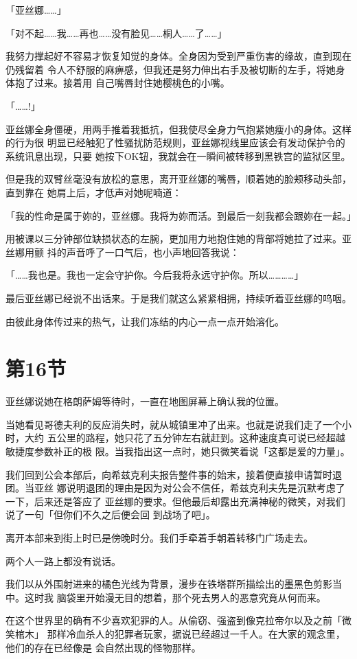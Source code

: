\documentclass[11pt]{book}
\begin{document}
「亚丝娜……」

「对不起……我……再也……没有脸见……桐人……了……」

我努力撑起好不容易才恢复知觉的身体。全身因为受到严重伤害的缘故，直到现在仍残留着
令人不舒服的麻痹感，但我还是努力伸出右手及被切断的左手，将她身体抱了过来。接着用
自己嘴唇封住她樱桃色的小嘴。

「……!」

亚丝娜全身僵硬，用两手推着我抵抗，但我使尽全身力气抱紧她瘦小的身体。这样的行为很
明显已经触犯了性骚扰防范规则，亚丝娜视线里应该会有发动保护令的系统讯息出现，只要
她按下OK钮，我就会在一瞬间被转移到黑铁宫的监狱区里。

但是我的双臂丝毫没有放松的意思，离开亚丝娜的嘴唇，顺着她的脸颊移动头部，直到靠在
她肩上后，才低声对她呢喃道：

「我的性命是属于妳的，亚丝娜。我将为妳而活。到最后一刻我都会跟妳在一起。」

用被课以三分钟部位缺损状态的左腕，更加用力地抱住她的背部将她拉了过来。亚丝娜用颤
抖的声音呼了一口气后，也小声地回答我说：

「……我也是。我也一定会守护你。今后我将永远守护你。所以…………」

最后亚丝娜已经说不出话来。于是我们就这么紧紧相拥，持续听着亚丝娜的呜咽。

由彼此身体传过来的热气，让我们冻结的内心一点一点开始溶化。
\section{第16节}
\label{sec:org935de97}
亚丝娜说她在格朗萨姆等待时，一直在地图屏幕上确认我的位置。

当她看见哥德夫利的反应消失时，就从城镇里冲了出来。也就是说我们走了一个小时，大约
五公里的路程，她只花了五分钟左右就赶到。这种速度真可说已经超越敏捷度参数补正的极
限。当我指出这一点时，她只微笑着说「这都是爱的力量」。

我们回到公会本部后，向希兹克利夫报告整件事的始末，接着便直接申请暂时退团。当亚丝
娜说明退团的理由是因为对公会不信任，希兹克利夫先是沉默考虑了一下，后来还是答应了
亚丝娜的要求。但他最后却露出充满神秘的微笑，对我们说了一句「但你们不久之后便会回
到战场了吧」。

离开本部来到街上时已是傍晚时分。我们手牵着手朝着转移门广场走去。

两个人一路上都没有说话。

我们以从外围射进来的橘色光线为背景，漫步在铁塔群所描绘出的墨黑色剪影当中。这时我
脑袋里开始漫无目的想着，那个死去男人的恶意究竟从何而来。

在这个世界里的确有不少喜欢犯罪的人。从偷窃、强盗到像克拉帝尔以及之前「微笑棺木」
那样冷血杀人的犯罪者玩家，据说已经超过一千人。在大家的观念里，他们的存在已经像是
会自然出现的怪物那样。
\end{document}
